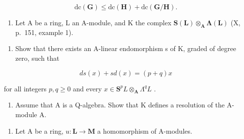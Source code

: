 \[
\mathrm{dc} (\mathbf {G}) \leqslant \mathrm{dc} (\mathbf {H}) + \mathrm{dc} (\mathbf {G} / \mathbf {H}).
\]


\begin{enumerate}
\def\labelenumi{\arabic{enumi})}
\tightlist
\item
  Let A be a ring, L an A-module, and K the complex \(\mathbf{S}(\mathbf{L})\otimes_{\mathbf{A}}\symbf{\Lambda}(\mathbf{L})\) (X, p.~151, example 1).
\end{enumerate}

\begin{enumerate}
\def\labelenumi{\alph{enumi})}
\tightlist
\item
  Show that there exists an A-linear endomorphism s of K, graded of degree zero, such that
\end{enumerate}

\[
d s (x) + s d (x) = (p + q) x
\]

for all integers \(p, q \geqslant 0\) and every \(x \in \mathbf{S}^p L \otimes_{\mathbf{A}} \Lambda^q L\) .

\begin{enumerate}
\def\labelenumi{\alph{enumi})}
\setcounter{enumi}{1}
\tightlist
\item
  Assume that A is a Q-algebra. Show that K defines a resolution of the A-module A.
\end{enumerate}

\begin{enumerate}
\def\labelenumi{\arabic{enumi})}
\setcounter{enumi}{1}
\tightlist
\item
  Let A be a ring, \(u: \mathbf{L} \to \mathbf{M}\) a homomorphism of A-modules.
\end{enumerate}

